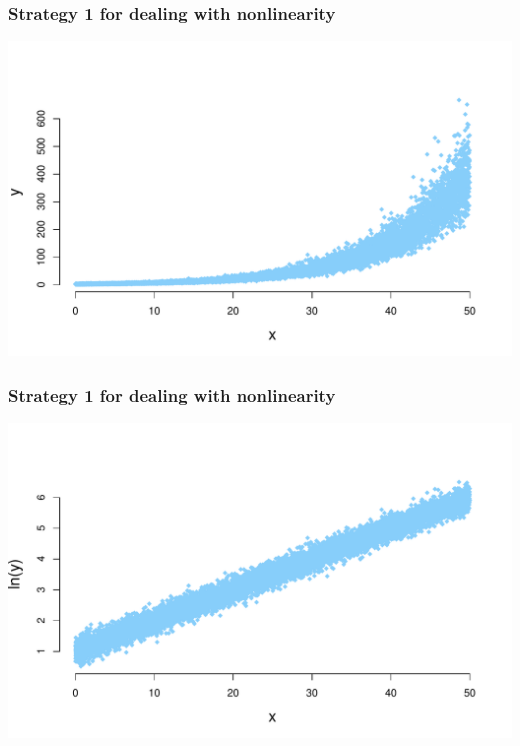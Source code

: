 \documentclass[aspectratio=169]{beamer}
\theoremstyle{principle}
\begin{document}
\begin{frame}
\frametitle{Strategy 1 for dealing with nonlinearity}

\begin{center}
\includegraphics[scale=0.6]{crazy_curve_exp.pdf}
\end{center}

\end{frame}

\begin{frame}
\frametitle{Strategy 1 for dealing with nonlinearity}

\begin{center}
\includegraphics[scale=0.6]{crazy_curve_exp_logged.pdf}
\end{center}

\end{frame}
\end{document}
